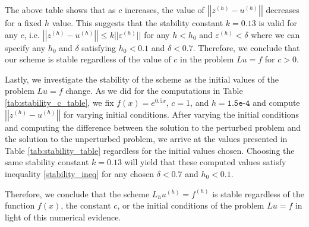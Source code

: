The above table shows that as $c$ increases, the value of
$\left|\left|z^{(h)} - u^{(h)}\right|\right|$ decreases for a fixed $h$ value. This
suggests that the stability constant $k = 0.13$ is valid for any $c$, i.e.
$\left|\left|z^{(h)} - u^{(h)}\right|\right| \leq k ||\varepsilon ^{(h)}||$ for
any $h < h_0$ and $\varepsilon^{(h)} < \delta$ where we can specify any $h_0$ and
$\delta$ satisfying $h_0 < 0.1$ and $\delta < 0.7$. Therefore, we conclude that
our scheme is stable regardless of the value of $c$ in the problem $Lu = f$ for $c > 0$.

Lastly, we investigate the stability of the scheme as the initial values of the
problem $Lu = f$ change. As we did for the computations in Table \ref{tab:stability_c_table},
we fix $f(x) = e^{0.5x}$, $c=1$, and $h=\texttt{1.5e-4}$ and compute $\left|\left|z^{(h)} - u^{(h)}\right|\right|$
for varying initial conditions. After varying the initial conditions and computing
the difference between the solution to the perturbed problem and the solution to
the unperturbed problem, we arrive at the values presented in Table \ref{tab:stability_table}
regardless for the initial values chosen. Choosing the same stability constant
$k = 0.13$ will yield that these computed values satisfy inequality \eqref{stability_ineq}
for any chosen $\delta < 0.7$ and $h_0 < 0.1$.

Therefore, we conclude that the scheme $L_h u^{(h)} = f^{(h)}$ is stable regardless
of the function $f(x)$, the constant $c$, or the initial conditions of the problem
$Lu = f$ in light of this numerical evidence.
